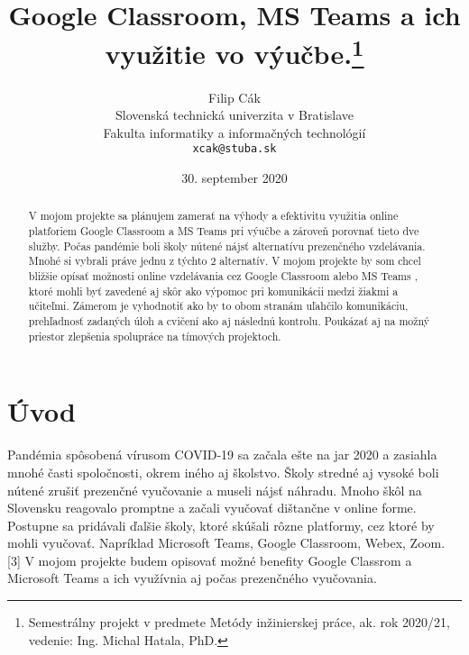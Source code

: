 \documentclass[10pt,slovak,a4paper]{article}
\title{Google Classroom,  MS Teams a ich využitie vo výučbe.\thanks{Semestrálny projekt v predmete Metódy inžinierskej práce, ak. rok 2020/21, vedenie: Ing. Michal Hatala, PhD. }}
\author{Filip Cák\\[2pt]
	{\small Slovenská technická univerzita v Bratislave}\\
	{\small Fakulta informatiky a informačných technológií}\\
	{\small \texttt{xcak@stuba.sk}}
	}
\date{\small 30. september 2020} %
\begin{document}
\maketitle

\begin{abstract}
V mojom projekte sa plánujem zamerať na výhody a efektivitu využitia online platforiem Google Classroom a MS Teams pri výučbe a zároveň porovnať tieto dve služby. Počas pandémie boli školy nútené nájsť alternatívu prezenčného vzdelávania. Mnohé si vybrali práve jednu z týchto 2 alternatív. \cite {COVID-19clanok} V mojom projekte by som chcel bližšie opísať možnosti online vzdelávania cez Google Classroom alebo MS Teams \cite {porovnanie}, ktoré mohli byť zavedené aj skôr ako výpomoc pri komunikácii medzi žiakmi a učiteľmi. Zámerom je vyhodnotiť ako by to obom stranám uľahčilo komunikáciu, prehľadnosť zadaných úloh a cvičení ako aj následnú kontrolu. Poukázať aj na možný priestor zlepšenia spolupráce na tímových projektoch.
\end{abstract}



\section{Úvod}

Pandémia spôsobená vírusom COVID-19 sa začala ešte na jar 2020 a zasiahla mnohé časti spoločnosti, okrem iného aj školstvo. Školy stredné aj vysoké boli nútené zrušiť prezenčné vyučovanie a museli nájsť náhradu. Mnoho škôl na Slovensku reagovalo promptne a začali vyučovať dištančne v online forme. Postupne sa pridávali ďalšie školy, ktoré skúšali rôzne platformy, cez ktoré by mohli vyučovať. Napríklad Microsoft Teams, Google Classroom, Webex, Zoom. [3] V mojom projekte budem opisovať možné benefity Google Classrom a Microsoft Teams a ich využívnia aj počas prezenčného vyučovania.
 


\end{document}
